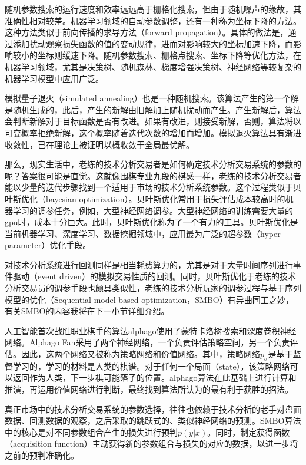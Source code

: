 \documentclass[twoside,longtitle]{LZUthesis}
\begin{document}
随机参数搜索的运行速度和效率远远高于栅格化搜索，但由于随机噪声的缘故，其准确性相对较差。机器学习领域的自动参数调整，还有一种称为坐标下降的方法。这种方法类似于前向传播的求导方法（forward propagation）。具体的做法是，通过添加扰动观察损失函数的值的变动规律，进而对影响较大的坐标加速下降，而影响较小的坐标则缓速下降。随机参数搜索、栅格点搜索、坐标下降等优化方法，在机器学习领域，尤其是决策树、随机森林、梯度增强决策树、神经网络等较复杂的机器学习模型中应用广泛。

模拟量子退火（simulated annealing）也是一种随机搜索。该算法产生的第一个解是随机生成的，此后，产生的新解由旧解加上随机扰动而产生。产生新解后，算法会判断新解对于目标函数是否有改进。如果有改进，则接受新解，否则，算法将以可变概率拒绝新解，这个概率随着迭代次数的增加而增加。模拟退火算法具有渐进收敛性，已在理论上被证明以概收敛于全局最优解\cite{Hwang1988Simulated}。

那么，现实生活中，老练的技术分析交易者是如何确定技术分析交易系统的参数的呢？答案很可能是直觉。这就像围棋专业九段的棋感一样，老练的技术分析交易者能以少量的迭代步骤找到一个适用于市场的技术分析系统参数。这个过程类似于贝叶斯优化（bayesian optimization）\cite{Pelikan2005Bayesian}。贝叶斯优化常用于损失评估成本较高时的机器学习的调参任务，例如，大型神经网络调参。大型神经网络的训练需要大量的gpu时，成本十分巨大。此时，贝叶斯优化称为了一个有力的工具。贝叶斯优化是当前机器学习、深度学习、数据挖掘领域中，应用最为广泛的超参数（hyper parameter）优化手段。

对技术分析系统进行回测同样是相当耗费算力的，尤其是对于大量时间序列进行事件驱动（event driven）的模拟交易性质的回测。同时，贝叶斯优化于老练的技术分析交易员的调参手段也颇具类似性，老练的技术分析玩家的调参过程与基于序列模型的优化（Sequential model-based optimization，SMBO）有异曲同工之妙，有关SMBO的内容我将在下一小节详细介绍。


人工智能首次战胜职业棋手的算法alphago\cite{2016Mastering}使用了蒙特卡洛树搜索和深度卷积神经网络。Alphago Fan采用了两个神经网络，一个负责评估策略空间，另一个负责评估。因此，这两个网络又被称为策略网络和价值网络。其中，策略网络$p_\sigma$是基于监督学习的，学习的材料是人类的棋谱。对于任何一个局面（state），该策略网络可以返回作为人类，下一步棋可能落子的位置。alphago算法在此基础上进行计算和推演，再运用价值网络进行判断，最终找到算法所认为的最有利于获胜的招法。


真正市场中的技术分析交易系统的参数选择，往往也依赖于技术分析的老手对盘面数据、回测数据的观察，之后采取的跳跃式的、类似神经网络的预测。SMBO算法中的核心是对不同参数组合产生的损失进行预判$p(y|x)$。同时，制定获得函数（acquisition function）主动获得新的参数组合与损失的对应的数据，以进一步将之前的预判准确化。
\end{document}
